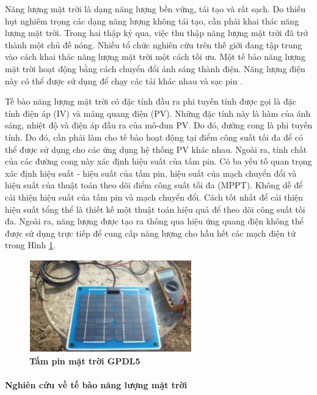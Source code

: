 \documentclass{article} %
\begin{document}
	Năng lượng mặt trời là dạng năng lượng bền vững, tái tạo và rất sạch. Do thiếu hụt nghiêm trọng các dạng năng lượng không tái tạo, cần phải khai thác năng lượng mặt trời. Trong hai thập kỷ qua, việc thu thập năng lượng mặt trời đã trở thành một chủ đề nóng. Nhiều tổ chức nghiên cứu trên thế giới đang tập trung vào cách khai thác năng lượng mặt trời một cách tối ưu. Một tế bào năng lượng mặt trời hoạt động bằng cách chuyển đổi ánh sáng thành điện. Năng lượng điện này có thể được sử dụng để chạy các tải khác nhau và sạc pin \cite{qin2012matlab}.
	
	Tế bào năng lượng mặt trời có đặc tính đầu ra phi tuyến tính được gọi là đặc tính điện áp (IV) và mảng quang điện (PV). Những đặc tính này là hàm của ánh sáng, nhiệt độ và điện áp đầu ra của mô-đun PV. Do đó, đường cong là phi tuyến tính. Do đó, cần phải làm cho tế bào hoạt động tại điểm công suất tối đa để có thể được sử dụng cho các ứng dụng hệ thống PV khác nhau. Ngoài ra, tính chất của các đường cong này xác định hiệu suất của tấm pin. Có ba yếu tố quan trọng xác định hiệu suất - hiệu suất của tấm pin, hiệu suất của mạch chuyển đổi và hiệu suất của thuật toán theo dõi điểm công suất tối đa (MPPT). Không dễ để cải thiện hiệu suất của tấm pin và mạch chuyển đổi. Cách tốt nhất để cải thiện hiệu suất tổng thể là thiết kế một thuật toán hiệu quả để theo dõi công suất tối đa. Ngoài ra, năng lượng được tạo ra thông qua hiệu ứng quang điện không thể được sử dụng trực tiếp để cung cấp năng lượng cho hầu hết các mạch điện tử trong Hình \ref{tampin}.
	
	\begin{figure}[!ht]
		\centering
		\includegraphics[width=7cm,height=4cm]{Images/tampin.png}
		\caption[Tấm pin mặt trời GPDL5\cite{batt2022design}]{\bfseries \fontsize{12pt}{0pt}\selectfont Tấm pin mặt trời GPDL5\cite{batt2022design} }
		\label{tampin}
	\end{figure}
	
	\paragraph{Nghiên cứu về tế bào năng lượng mặt trời}\mbox{}
	
\end{document}
